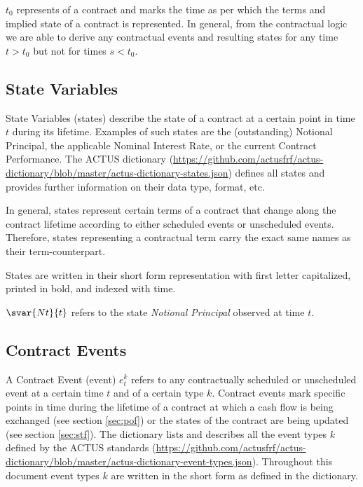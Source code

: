 $t_0$ represents  of a contract and marks the time as per which the terms and implied state of a contract is represented. In general, from the contractual logic we are able to derive any contractual events and resulting states for any time $t>t_0$ but not for times $s<t_0$.


\subsection{State Variables}\label{sec:statevarsnotat}

State Variables (states) describe the state of a contract at a certain point in time $t$ during its lifetime. Examples of such states are the (outstanding) Notional Principal, the applicable Nominal Interest Rate, or the current Contract Performance. The ACTUS dictionary (\url{https://github.com/actusfrf/actus-dictionary/blob/master/actus-dictionary-states.json}) defines all states and provides further information on their data type, format, etc.

In general, states represent certain terms of a contract that change along the contract lifetime according to either scheduled events or unscheduled events. Therefore, states representing a contractual term carry the exact same names as their term-counterpart.

States are written in their short form representation with first letter capitalized, printed in bold, and indexed with time.

\begin{example}
$\svar{Nt}{t}$ refers to the state \textit{Notional Principal} observed at time $t$.
\end{example}


\subsection{Contract Events}\label{sec:events}

A Contract Event (event) $e_t^k$ refers to any contractually scheduled or unscheduled event at a certain time $t$ and of a certain type $k$. Contract events mark specific points in time during the lifetime of a contract at which a cash flow is being exchanged (see section \ref{sec:pof}) or the states of the contract are being updated (see section \ref{sec:stf}). The dictionary lists and describes all the event types $k$ defined by the ACTUS standards (\url{https://github.com/actusfrf/actus-dictionary/blob/master/actus-dictionary-event-types.json}). Throughout this document event types $k$ are written in the short form as defined in the dictionary.

